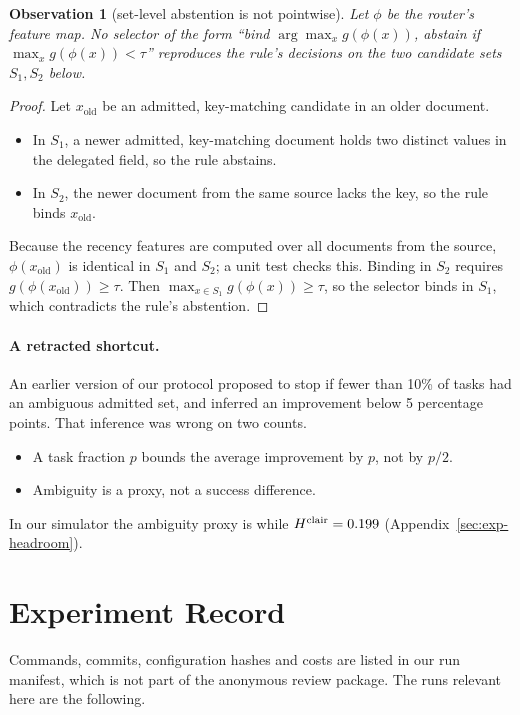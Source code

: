\documentclass{article}
\newtheorem{observation}{Observation}
\begin{document}
\begin{observation}[set-level abstention is not pointwise]
\label{obs:set}
Let $\phi$ be the router's feature map. No selector of the form ``bind
$\arg\max_x g(\phi(x))$, abstain if $\max_x g(\phi(x))<\tau$'' reproduces
the rule's decisions on the two candidate sets $S_1,S_2$ below.
\end{observation}
\begin{proof}
Let $x_{\mathrm{old}}$ be an admitted, key-matching candidate in an older
document.
\begin{itemize}
\item In $S_1$, a newer admitted, key-matching document holds two distinct
values in the delegated field, so the rule abstains.
\item In $S_2$, the newer document from the same source lacks the key, so the
rule binds $x_{\mathrm{old}}$.
\end{itemize}
Because the recency features are computed over all documents from the
source, $\phi(x_{\mathrm{old}})$ is identical in $S_1$ and $S_2$; a unit test
checks this. Binding in $S_2$ requires $g(\phi(x_{\mathrm{old}}))\ge\tau$.
Then $\max_{x\in S_1}g(\phi(x))\ge\tau$, so the selector binds in $S_1$,
which contradicts the rule's abstention.
\end{proof}

\paragraph{A retracted shortcut.}
An earlier version of our protocol proposed to stop if fewer than 10\% of
tasks had an ambiguous admitted set, and inferred an improvement below 5
percentage points. That inference was wrong on two counts.
\begin{itemize}
\item A task fraction $p$ bounds the average improvement by $p$, not by
$p/2$.
\item Ambiguity is a proxy, not a success difference.
\end{itemize}
In our simulator the ambiguity proxy is \ProxySim{} while
$H^{\mathrm{clair}}=0.199$ (Appendix~\ref{sec:exp-headroom}).

\section{Experiment Record}
\label{app:record}
Commands, commits, configuration hashes and costs are listed in our run
manifest, which is not part of the anonymous review package. The runs relevant here are the following.
\end{document}
